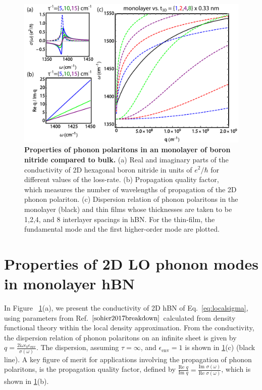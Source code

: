 \documentclass[aps,prb,twocolumn,
	           groupedaddress,superscriptaddress,
               amsfonts,amssymb,amsmath,floatfix,
	           citeautoscript]{revtex4-1}
\newcommand{\iu}{\mathrm{i}}
\begin{document}
\begin{figure}[t]
    \includegraphics[width=135mm]{figure2hBN.pdf}
    \caption{%
        \textbf{Properties of phonon polaritons in an monolayer of boron nitride compared to bulk.} (a) Real and imaginary parts of the conductivity of 2D hexagonal boron nitride in units of $e^2/\hbar$ for different values of the loss-rate. (b) Propagation quality factor, which measures the number of wavelengths of propagation of the 2D phonon polariton. (c) Dispersion relation of phonon polaritons in the monolayer (black) and thin films whose thicknesses are taken to be 1,2,4, and 8 interlayer spacings in hBN. For the thin-film, the fundamental mode and the first higher-order mode are plotted. 
        \label{fig:2}
        }
\end{figure}

\section{Properties of 2D LO phonon modes in monolayer hBN}

In Figure ~\ref{fig:2}(a), we present the conductivity of 2D hBN of Eq.~\ref{eq:localsigma}, using parameters from Ref. $\cite{sohier2017breakdown}$ calculated from density functional theory within the local density approximation. From the conductivity, the dispersion relation of phonon polaritons on an infinite sheet is given by $q=\frac{2\iu\omega\epsilon_0\epsilon_{\mathrm{env}}}{\sigma(\omega)}$. The dispersion, assuming $\tau = \infty$, and $\epsilon_{\mathrm{env}}=1$ is shown in \ref{fig:2}(c) (black line). A key figure of merit for applications involving the propagation of phonon polaritons, is the propagation quality factor, defined by $\frac{\text{Re }q}{\text{Im }q} = \frac{\text{Im }\sigma(\omega)}{\text{Re }\sigma(\omega)}$, which is shown in \ref{fig:2}(b).
\end{document}
